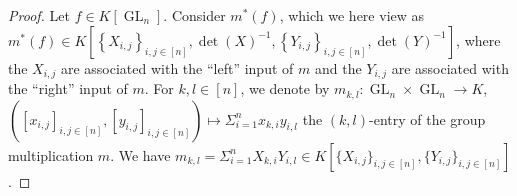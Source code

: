 \begin{proof}
  Let $f \in K \left\lbrack \operatorname{GL}_n \right\rbrack $.
  Consider $m^\ast(f)$, which we here view as \linebreak$ m^\ast(f) \in K \left\lbrack \left\{ X_{i,j} \right\}_{i,j \in [ n ]} , \operatorname{det} \left( X \right)^{-1} , \left\{ Y_{i,j} \right\}_{i,j \in [ n ]} , \operatorname{det} \left( Y \right)^{-1} \right\rbrack $, where the $X_{i,j}$ are associated with the ``left'' input of $m$ and the $Y_{i,j}$ are associated with the ``right'' input of $m$.
  For $k,l \in [n]$, we denote by $m_{k,l} \colon \operatorname{GL}_n \times \operatorname{GL}_n \rightarrow K$, $([x_{i,j}]_{i,j \in [n]},[y_{i,j}]_{i,j \in [n]}) \mapsto \Sigma_{i=1}^n x_{k,i}y_{i,l}$ the $(k,l)$-entry of the group multiplication $m$.
  We have $m_{k,l} = \Sigma_{i=1}^n X_{k,i}Y_{i,l} \in K[\{X_{i,j}\}_{i,j\in[n]},\{Y_{i,j}\}_{i,j\in[n]}]$.
    

\end{proof}
